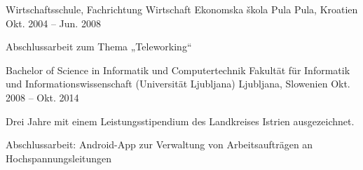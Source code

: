 

\begin{cventries}
\cventry
  {Wirtschaftsschule, Fachrichtung Wirtschaft} %
  {Ekonomska škola Pula} %
  {Pula, Kroatien}
  {Okt. 2004 -- Jun. 2008}
  {
    \begin{cvitems}
      \item{Abschlussarbeit zum Thema „Teleworking“}
    \end{cvitems}
  }

\cventry
    {Bachelor of Science in Informatik und Computertechnik} %
    {Fakultät für Informatik und Informationswissenschaft (Universität Ljubljana)} %
    {Ljubljana, Slowenien} %
    {Okt. 2008 -- Okt. 2014} %
    {
      \begin{cvitems} %
        \item {Drei Jahre mit einem Leistungsstipendium des Landkreises Istrien ausgezeichnet.}
        \item {Abschlussarbeit: Android-App zur Verwaltung von Arbeitsaufträgen an Hochspannungsleitungen}
      \end{cvitems}
    }

\end{cventries}
